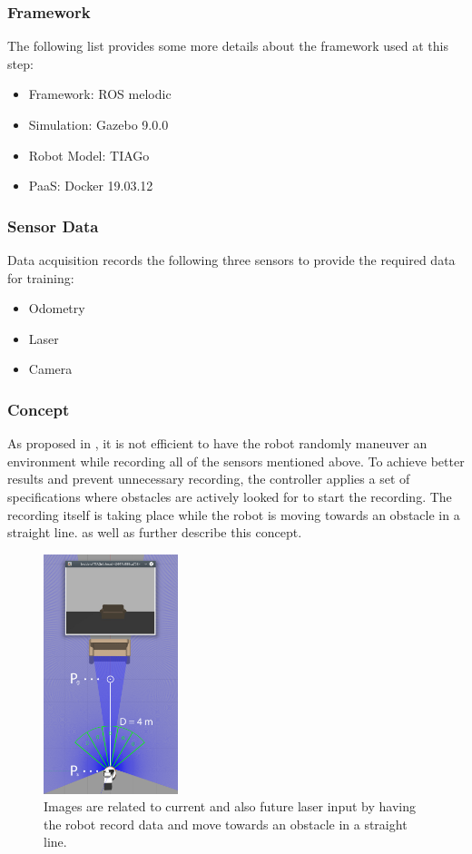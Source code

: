 \subsubsection{Framework \label{framework} }
The following list provides some more details about the framework used at this step:
\begin{itemize}
\item Framework: ROS melodic
\item Simulation: Gazebo 9.0.0
\item Robot Model: TIAGo
\item PaaS: Docker 19.03.12
\end{itemize}

\subsubsection{Sensor Data \label{sensordata} }
Data acquisition records the following three sensors to provide the required data for training:
\begin{itemize}
\item Odometry
\item Laser
\item Camera
\end{itemize}

\subsubsection{Concept \label{Concept} }
As proposed in \cite{nava2019learning}, it is not efficient to have the robot randomly maneuver an environment while recording all of the sensors mentioned above. To achieve better results and prevent unnecessary recording, the controller applies a set of specifications where obstacles are actively looked for to start the recording. The recording itself is taking place while the robot is moving towards an obstacle in a straight line.  as well as  further describe this concept.\\

\begin{figure}
\centering
\includegraphics[width=0.35\textwidth]{Bilder/Straight_line.png}
\captionsetup{width=0.35\textwidth}
\caption{Images are related to current and also future laser input by having the robot record data and move towards an obstacle in a straight line.}
\label{straight_line}
\end{figure}
\newpage


